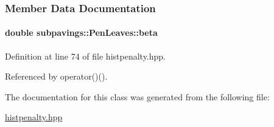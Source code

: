 \subsubsection{\-Member \-Data \-Documentation}
\hypertarget{classsubpavings_1_1PenLeaves_ae16bb757e6d5ec3eddfe77d22a8e4b8e}{
\paragraph[{beta}]{\setlength{\rightskip}{0pt plus 5cm}double {\bf subpavings\-::\-Pen\-Leaves\-::beta}}}\label{classsubpavings_1_1PenLeaves_ae16bb757e6d5ec3eddfe77d22a8e4b8e}


\-Definition at line 74 of file histpenalty.\-hpp.



\-Referenced by operator()().



\-The documentation for this class was generated from the following file\-:\begin{DoxyCompactItemize}
\item 
\hyperlink{histpenalty_8hpp}{histpenalty.\-hpp}\end{DoxyCompactItemize}
